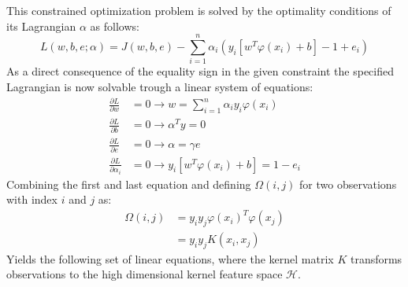 \documentclass[preprint,12pt]{elsarticle}
\begin{document}
This constrained optimization problem is solved by the optimality conditions of its Lagrangian $\alpha$ as follows:
\begin{equation}
L(w,b,e;\alpha) = J(w,b,e) - \sum_{i=1}^{n} \alpha_i(y_i [ w^T \varphi(x_i) + b]-1 + e_i)
\label{eq:lagrangian}
\end{equation}
As a direct consequence of the equality sign in the given constraint the specified Lagrangian is now solvable trough a linear system of equations:
\begin{align}
\frac{\partial L}{\partial w} &= 0 \rightarrow w = \sum_{i=1}^{n} \alpha_i y_i \varphi(x_i) \\
\frac{\partial L}{\partial b} &= 0 \rightarrow \alpha^T y = 0 \\
\frac{\partial L}{\partial e} &= 0 \rightarrow \alpha = \gamma e \\
\frac{\partial L}{\partial \alpha_i} &= 0 \rightarrow y_i [w^T \varphi(x_i) + b ] = 1 - e_i 	
\end{align}
Combining the first and last equation and defining $\Omega{(i,j)}$ for two observations with index $i$ and $j$ as:
\begin{align}
\Omega{(i,j)} &= y_i y_j \varphi(x_i)^T \varphi(x_j) \\
&= y_i y_j K(x_i, x_j)
\end{align}
Yields the following set of linear equations, where the kernel matrix $K$ transforms observations to the high dimensional kernel feature space $\mathcal{H}$.
\end{document}

